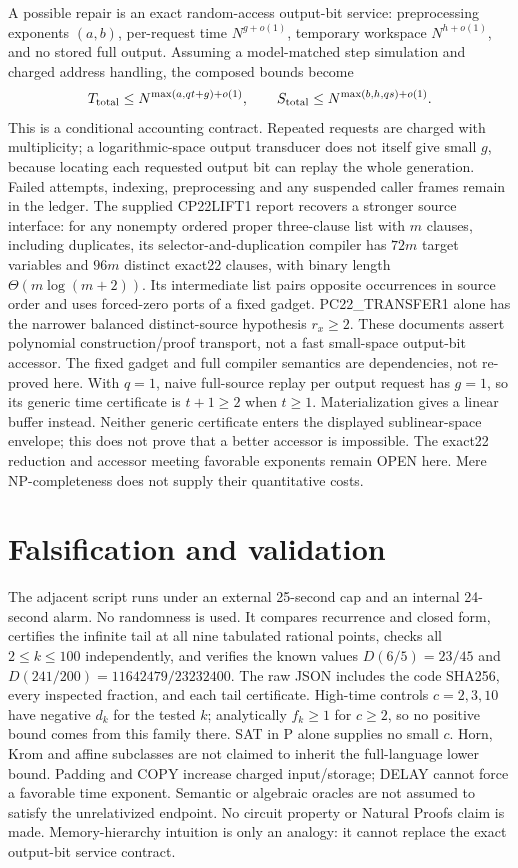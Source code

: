 \documentclass[11pt]{article}
\begin{document}
A possible repair is an exact random-access output-bit service:
preprocessing exponents $(a,b)$, per-request time $N^{g+o(1)}$,
temporary workspace $N^{h+o(1)}$, and no stored full output.
Assuming a model-matched step simulation and charged address handling,
the composed bounds become
\[
 T_{\rm total}\le N^{\max(a,qt+g)+o(1)},\qquad
 S_{\rm total}\le N^{\max(b,h,qs)+o(1)}.
\]
This is a conditional accounting contract. Repeated requests are charged
with multiplicity; a logarithmic-space output transducer does not itself
give small $g$, because locating each requested output bit can replay
the whole generation. Failed attempts, indexing, preprocessing and any
suspended caller frames remain in the ledger.
The supplied CP22LIFT1 report recovers a stronger source interface:
for any nonempty ordered proper three-clause list with $m$ clauses,
including duplicates, its selector-and-duplication compiler has
$72m$ target variables and $96m$ distinct exact22 clauses, with binary
length $\Theta(m\log(m+2))$. Its intermediate list pairs opposite
occurrences in source order and uses forced-zero ports of a fixed gadget.
PC22\_TRANSFER1 alone has the narrower balanced distinct-source hypothesis
$r_x\ge2$. These documents assert polynomial construction/proof transport,
not a fast small-space output-bit accessor. The fixed gadget and full
compiler semantics are dependencies, not re-proved here.
With $q=1$, naive full-source replay per output request has $g=1$,
so its generic time certificate is $t+1\ge2$ when $t\ge1$.
Materialization gives a linear buffer instead. Neither generic certificate
enters the displayed sublinear-space envelope; this does not prove that a
better accessor is impossible.
The exact22 reduction and accessor meeting favorable exponents remain
OPEN here. Mere NP-completeness does not supply their quantitative costs.

\section{Falsification and validation}
The adjacent script runs under an external 25-second cap and an internal
24-second alarm. No randomness is used. It compares recurrence and closed
form, certifies the infinite tail at all nine tabulated rational points,
checks all $2\le k\le100$ independently, and verifies the known values
$D(6/5)=23/45$ and $D(241/200)=11642479/23232400$.
The raw JSON includes the code SHA256, every inspected fraction, and each
tail certificate. High-time controls $c=2,3,10$ have negative $d_k$ for
the tested $k$; analytically $f_k\ge1$ for $c\ge2$, so no positive bound
comes from this family there. SAT in P alone supplies no small $c$.
Horn, Krom and affine subclasses are not claimed to inherit the full-language
lower bound. Padding and COPY increase charged input/storage; DELAY cannot
force a favorable time exponent. Semantic or algebraic oracles are not
assumed to satisfy the unrelativized endpoint. No circuit property or
Natural Proofs claim is made. Memory-hierarchy intuition is only an analogy:
it cannot replace the exact output-bit service contract.
\end{document}
